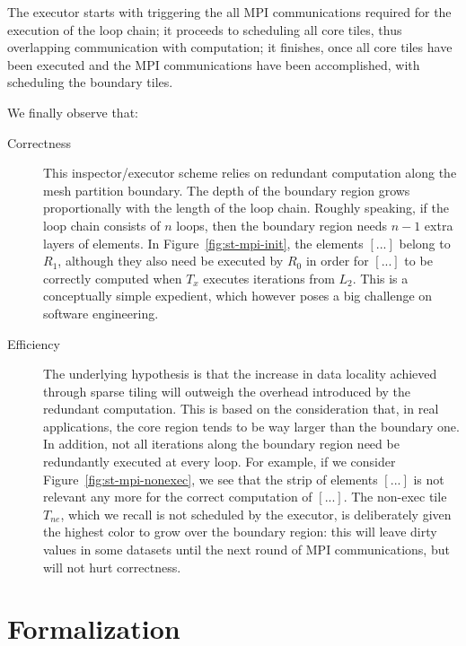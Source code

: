 The executor starts with triggering the all MPI communications required for the execution of the loop chain; it proceeds to scheduling all core tiles, thus overlapping communication with computation; it finishes, once all core tiles have been executed and the MPI communications have been accomplished, with scheduling the boundary tiles.

We finally observe that:
\begin{description}
\item[Correctness] This inspector/executor scheme relies on redundant computation along the mesh partition boundary. The depth of the boundary region grows proportionally with the length of the loop chain. Roughly speaking, if the loop chain consists of $n$ loops, then the boundary region needs $n-1$ extra layers of elements. In Figure~\ref{fig:st-mpi-init}, the elements $[...]$ belong to $R_1$, although they also need be executed by $R_0$ in order for $[...]$ to be correctly computed when $T_x$ executes iterations from $L_2$. This is a conceptually simple expedient, which however poses a big challenge on software engineering. 
\item[Efficiency] The underlying hypothesis is that the increase in data locality achieved through sparse tiling will outweigh the overhead introduced by the redundant computation. This is based on the consideration that, in real applications, the core region tends to be way larger than the boundary one. In addition, not all iterations along the boundary region need be redundantly executed at every loop. For example, if we consider Figure~\ref{fig:st-mpi-nonexec}, we see that the strip of elements $[...]$ is not relevant any more for the correct computation of $[...]$. The non-exec tile $T_{ne}$, which we recall is not scheduled by the executor, is deliberately given the highest color to grow over the boundary region: this will leave dirty values in some datasets until the next round of MPI communications, but will not hurt correctness. 
\end{description}





\section{Formalization}
\label{sec:tiling:algo}

